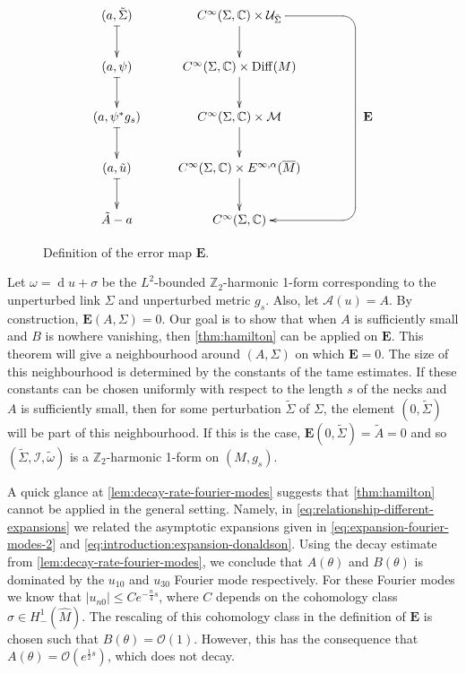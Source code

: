 \documentclass[preprint,12pt]{elsarticle}
\numberwithin{table}{section}
\newcommand{\Z}{\mathbb{Z}}
\newcommand{\C}{\mathbb{C}}
\renewcommand{\d}{\operatorname{d}\!}
\renewcommand{\O}{\mathcal{O}}
\begin{document}
\begin{figure}
	$$
	\xymatrix{
		(a, \tilde \Sigma) \ar@{|->}[d] & C^{\infty}(\Sigma, \C) \times \mathcal{U}_{\tilde \Sigma} \ar[d] 
		\ar `r[dr]
		`d[ddddr]
		[dddd]
		\\
		(a, \psi) \ar@{|->}[d] & C^{\infty}(\Sigma, \C) \times  \operatorname{Diff}(M) \ar[d] & \\ 
		(a, \psi^* g_s)  \ar@{|->}[d] &  C^{\infty}(\Sigma, \C) \times \mathcal{M}  \ar[d] & \qquad \mathbf{E}\\
		(a, \tilde u) \ar@{|->}[d] & C^{\infty}(\Sigma, \C) \times  E^{\infty, \alpha}(\overline{M}) \ar[d] & \\
		\tilde A - a & C^{\infty}(\Sigma, \C) & 
	}
	$$
	\caption{Definition of the error map $\mathbf{E}$.}
	\label{fig:definition-error-map}
\end{figure}

Let $\omega = \d u + \sigma$ be the $L^2$-bounded $\Z_2$-harmonic 1-form corresponding to the unperturbed link $\Sigma$ and unperturbed metric $g_s$. Also, let $\mathcal{A}(u) = A$. By construction, $\mathbf{E}(A, \Sigma) = 0$. Our goal is to show that when $A$ is sufficiently small and $B$ is nowhere vanishing, then \cref{thm:hamilton} can be applied on $\mathbf{E}$. This theorem will give a neighbourhood around $(A, \Sigma)$ on which $\mathbf{E} = 0$. The size of this neighbourhood is determined by the constants of the tame estimates. If these constants can be chosen uniformly with respect to the length $s$ of the necks and $A$ is sufficiently small, then for some perturbation $\tilde \Sigma$ of $\Sigma$, the element $(0, \tilde{\Sigma})$ will be part of this neighbourhood. If this is the case, $\mathbf{E}(0, \tilde \Sigma) = \tilde A = 0$ and so $(\tilde{\Sigma}, \mathcal{I}, \tilde \omega)$ is a $\Z_2$-harmonic 1-form on $(M, g_s)$.

A quick glance at \cref{lem:decay-rate-fourier-modes} suggests that \cref{thm:hamilton} cannot be applied in the general setting. Namely, in \cref{eq:relationship-different-expansions} we related the asymptotic expansions given in \cref{eq:expansion-fourier-modes-2} and \cref{eq:introduction:expansion-donaldson}. Using the decay estimate from \cref{lem:decay-rate-fourier-modes}, we conclude that $A(\theta)$ and $B(\theta)$ is dominated by the $u_{10}$ and $u_{30}$ Fourier mode respectively. For these Fourier modes we know that $|u_{n0}| \le C e^{-\frac{n}{4}s}$, where $C$ depends on the cohomology class $\sigma \in H^1_-(\hat{M})$. The rescaling of this cohomology class in the definition of $\mathbf{E}$ is chosen such that $B(\theta) = \O(1)$. However, this has the consequence that $A(\theta) = \O(e^{\frac{1}{2}s})$, which does not decay.
\end{document}

